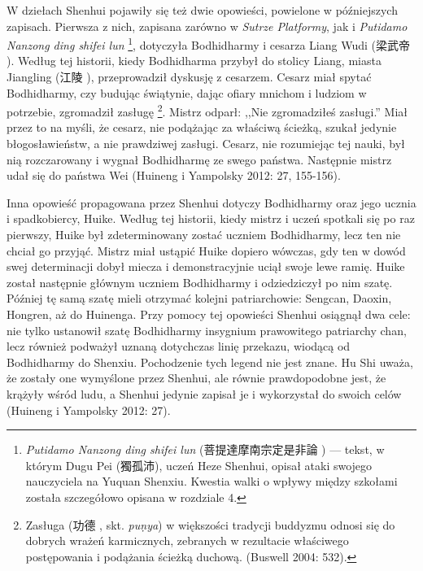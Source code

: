 W dziełach Shenhui pojawiły się też dwie opowieści, powielone w późniejszych zapisach. %
Pierwsza z nich, zapisana zarówno w \textit{Sutrze Platformy}, jak i \textit{Putidamo Nanzong ding shifei lun}%
\footnote{\textit{Putidamo Nanzong ding shifei lun} (菩提達摩南宗定是非論 ) --- tekst, w którym Dugu Pei (獨孤沛), uczeń Heze Shenhui, opisał ataki swojego nauczyciela na Yuquan Shenxiu. Kwestia walki o wpływy między szkołami została szczegółowo opisana w rozdziale 4.}, dotyczyła Bodhidharmy i cesarza Liang Wudi (梁武帝 ).
Według tej historii, kiedy Bodhidharma przybył do stolicy Liang, miasta Jiangling (江陵 ), przeprowadził dyskusję z cesarzem. Cesarz miał spytać Bodhidharmy, czy budując świątynie, dając ofiary mnichom i ludziom w potrzebie, zgromadził zasługę%
\footnote{Zasługa (功德 , skt. \textit{pu\d{n}ya}) w większości tradycji buddyzmu odnosi się do dobrych wrażeń karmicznych, zebranych w rezultacie właściwego postępowania i podążania ścieżką duchową. (Buswell 2004: 532).}.
Mistrz odparł: ,,Nie zgromadziłeś zasługi.'' Miał przez to na myśli, że cesarz, nie podążając za właściwą ścieżką, szukał jedynie błogosławieństw, a nie prawdziwej zasługi. Cesarz, nie rozumiejąc tej nauki, był nią rozczarowany i wygnał Bodhidharmę ze swego państwa. Następnie mistrz udał się do\label{LiangWuDi} państwa Wei %
(Huineng i Yampolsky 2012: 27, 155-156).


Inna opowieść propagowana przez Shenhui dotyczy Bodhidharmy oraz jego ucznia i spadkobiercy, Huike. Według tej historii, kiedy mistrz i uczeń spotkali się po raz pierwszy, Huike był zdeterminowany zostać uczniem Bodhidharmy, lecz ten nie chciał go przyjąć. Mistrz miał ustąpić Huike dopiero wówczas, gdy ten w dowód swej determinacji dobył miecza i demonstracyjnie uciął swoje lewe ramię. Huike został następnie głównym uczniem Bodhidharmy i odziedziczył po nim szatę. Później tę samą szatę mieli otrzymać kolejni patriarchowie: Sengcan, Daoxin, Hongren, aż do Huinenga. Przy pomocy tej opowieści Shenhui osiągnął dwa cele: nie tylko ustanowił szatę Bodhidharmy insygnium prawowitego patriarchy chan, lecz również podważył uznaną dotychczas linię przekazu, wiodącą od Bodhidharmy do Shenxiu. Pochodzenie tych legend nie jest znane. Hu Shi uważa, że zostały one wymyślone przez Shenhui, ale równie prawdopodobne jest, że krążyły wśród ludu, a Shenhui jedynie zapisał je i wykorzystał do swoich celów (Huineng i Yampolsky 2012: 27).

